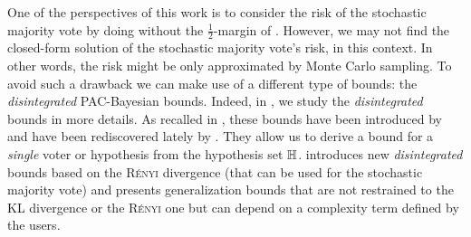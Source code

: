 One of the perspectives of this work is to consider the risk of the stochastic majority vote by doing without the $\frac{1}{2}$-margin of \citet{LavioletteMorvantRalaivolaRoy2017}.
However, we may not find the closed-form solution of the stochastic majority vote's risk, in this context.
In other words, the risk might be only approximated by Monte Carlo sampling.
To avoid such a drawback we can make use of a different type of bounds: the {\it disintegrated} PAC-Bayesian bounds.
Indeed, in , we study the {\it disintegrated} bounds in more details.
As recalled in , these bounds have been introduced by \citet{Catoni2007,BlanchardFleuret2007} and have been rediscovered lately by \citet{RivasplataKuzborskijSzepesvariShaweTaylor2020}.
They allow us to derive a bound for a {\it single} voter or hypothesis from the hypothesis set $\mathbb{H}$.  
 introduces new {\it disintegrated} bounds based on the \textsc{Rényi} divergence (that can be used for the stochastic majority vote) and  presents generalization bounds that are not restrained to the KL divergence or the \textsc{Rényi} one but can depend on a complexity term defined by the users.